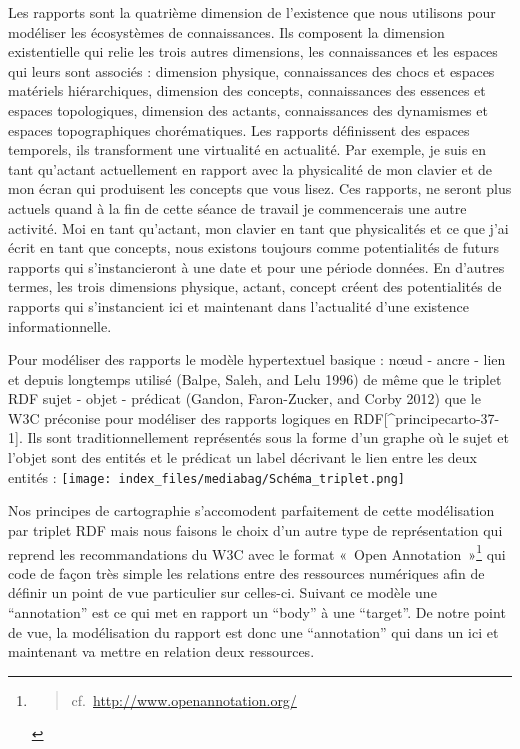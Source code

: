 \documentclass[
  letterpaper,
  DIV=11,
  numbers=noendperiod]{scrreprt}
\begin{document}
Les rapports sont la quatrième dimension de l'existence que nous
utilisons pour modéliser les écosystèmes de connaissances. Ils composent
la dimension existentielle qui relie les trois autres dimensions, les
connaissances et les espaces qui leurs sont associés : dimension
physique, connaissances des chocs et espaces matériels hiérarchiques,
dimension des concepts, connaissances des essences et espaces
topologiques, dimension des actants, connaissances des dynamismes et
espaces topographiques chorématiques. Les rapports définissent des
espaces temporels, ils transforment une virtualité en actualité. Par
exemple, je suis en tant qu'actant actuellement en rapport avec la
physicalité de mon clavier et de mon écran qui produisent les concepts
que vous lisez. Ces rapports, ne seront plus actuels quand à la fin de
cette séance de travail je commencerais une autre activité. Moi en tant
qu'actant, mon clavier en tant que physicalités et ce que j'ai écrit en
tant que concepts, nous existons toujours comme potentialités de futurs
rapports qui s'instancieront à une date et pour une période données. En
d'autres termes, les trois dimensions physique, actant, concept créent
des potentialités de rapports qui s'instancient ici et maintenant dans
l'actualité d'une existence informationnelle.

Pour modéliser des rapports le modèle hypertextuel basique : nœud -
ancre - lien et depuis longtemps utilisé (Balpe, Saleh, and Lelu 1996)
de même que le triplet RDF sujet - objet - prédicat (Gandon,
Faron-Zucker, and Corby 2012) que le W3C préconise pour modéliser des
rapports logiques en RDF{[}\^{}principecarto-37-1{]}. Ils sont
traditionnellement représentés sous la forme d'un graphe où le sujet et
l'objet sont des entités et le prédicat un label décrivant le lien entre
les deux entités :
\texttt{[image: index\_files/mediabag/Schéma\_triplet.png]}

Nos principes de cartographie s'accomodent parfaitement de cette
modélisation par triplet RDF mais nous faisons le choix d'un autre type
de représentation qui reprend les recommandations du W3C avec le format
«~Open Annotation~»\footnote{\begin{quote}
  cf.~\url{http://www.openannotation.org/}
  \end{quote}} qui code de façon très simple les relations entre des
ressources numériques afin de définir un point de vue particulier sur
celles-ci. Suivant ce modèle une ``annotation'' est ce qui met en
rapport un ``body'' à une ``target''. De notre point de vue, la
modélisation du rapport est donc une ``annotation'' qui dans un ici et
maintenant va mettre en relation deux ressources.
\end{document}
